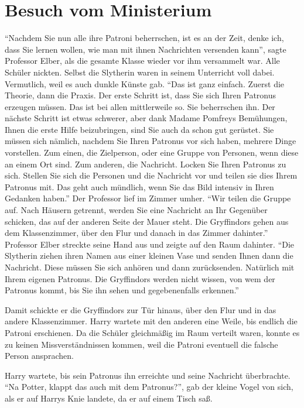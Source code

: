 \chapter{Besuch vom Ministerium}


\enquote{Nachdem Sie nun alle ihre Patroni beherrschen, ist es an der Zeit, denke ich, dass Sie lernen wollen, wie man mit ihnen Nachrichten versenden kann}, sagte Professor Elber, als die gesamte Klasse wieder vor ihm versammelt war. Alle Schüler nickten. Selbst die Slytherin waren in seinem Unterricht voll dabei. Vermutlich, weil es auch dunkle Künste gab. \enquote{Das ist ganz einfach. Zuerst die Theorie, dann die Praxis. Der erste Schritt ist, dass Sie sich Ihren Patronus erzeugen müssen. Das ist bei allen mittlerweile so. Sie beherrschen ihn. Der nächste Schritt ist etwas schwerer, aber dank Madame Pomfreys Bemühungen, Ihnen die erste Hilfe beizubringen, sind Sie auch da schon gut gerüstet. Sie müssen sich nämlich, nachdem Sie Ihren Patronus vor sich haben, mehrere Dinge vorstellen. Zum einen, die Zielperson, oder eine Gruppe von Personen, wenn diese an einem Ort sind. Zum anderen, die Nachricht. Locken Sie Ihren Patronus zu sich. Stellen Sie sich die Personen und die Nachricht vor und teilen sie dies Ihrem Patronus mit. Das geht auch mündlich, wenn Sie das Bild intensiv in Ihren Gedanken haben.} Der Professor lief im Zimmer umher. \enquote{Wir teilen die Gruppe auf. Nach Häusern getrennt, werden Sie eine Nachricht an Ihr Gegenüber schicken, das auf der anderen Seite der Mauer steht. Die Gryffindors gehen aus dem Klassenzimmer, über den Flur und danach in das Zimmer dahinter.} Professor Elber streckte seine Hand aus und zeigte auf den Raum dahinter. \enquote{Die Slytherin ziehen ihren Namen aus einer kleinen Vase und senden Ihnen dann die Nachricht. Diese müssen Sie sich anhören und dann zurücksenden. Natürlich mit Ihrem eigenen Patronus. Die Gryffindors werden nicht wissen, von wem der Patronus kommt, bis Sie ihn sehen und gegebenenfalls erkennen.}

Damit schickte er die Gryffindors zur Tür hinaus, über den Flur und in das andere Klassenzimmer. Harry wartete mit den anderen eine Weile, bis endlich die Patroni erschienen. Da die Schüler gleichmäßig im Raum verteilt waren, konnte es zu keinen Missverständnissen kommen, weil die Patroni eventuell die falsche Person ansprachen.

Harry wartete, bis sein Patronus ihn erreichte und seine Nachricht überbrachte. \enquote{Na Potter, klappt das auch mit dem Patronus?}, gab der kleine Vogel von sich, als er auf Harrys Knie landete, da er auf einem Tisch saß.

